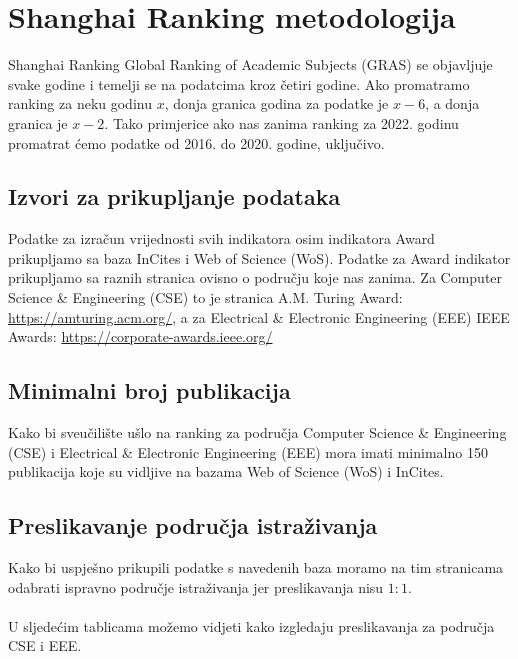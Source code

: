 \documentclass[times, utf8, zavrsni]{fer}
\begin{document}
\chapter{Shanghai Ranking metodologija}
Shanghai Ranking Global Ranking of Academic Subjects (GRAS) se objavljuje svake godine i temelji se na podatcima kroz četiri godine.
Ako  promatramo ranking za neku godinu $x$,
donja granica godina za podatke je $x-6$, a donja granica je $x-2$. Tako primjerice ako nas zanima ranking za 2022. godinu promatrat ćemo podatke od 2016. do 2020. godine, uključivo.

\section{Izvori za prikupljanje podataka}
Podatke za izračun vrijednosti svih indikatora osim indikatora Award prikupljamo sa baza InCites i Web of Science (WoS). 
Podatke za Award indikator prikupljamo sa raznih stranica ovisno o području koje nas zanima.
Za Computer Science \& Engineering (CSE) to je stranica A.M. Turing Award: \url{https://amturing.acm.org/}, a za Electrical \& Electronic Engineering (EEE) IEEE Awards:
\url{https://corporate-awards.ieee.org/}

\section{Minimalni broj publikacija} Kako bi sveučilište ušlo na ranking za područja Computer Science \& Engineering (CSE) i Electrical \& Electronic Engineering (EEE) mora imati minimalno 150 publikacija koje su vidljive 
na bazama Web of Science (WoS) i InCites.
\\ \section{Preslikavanje područja istraživanja}Kako bi uspješno prikupili podatke s navedenih baza moramo na tim stranicama odabrati ispravno područje istraživanja jer preslikavanja nisu $1:1$.
\\\\U sljedećim tablicama možemo vidjeti kako izgledaju preslikavanja za područja CSE i EEE.
\end{document}

